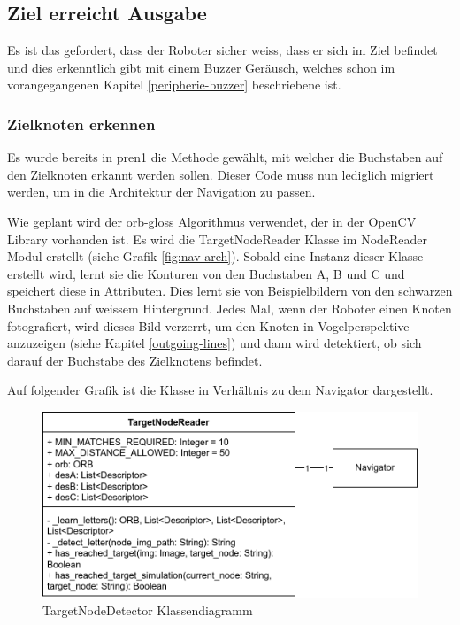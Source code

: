 \subsection{Ziel erreicht Ausgabe}

Es ist das gefordert, dass der Roboter sicher weiss, dass er sich im Ziel befindet und dies erkenntlich gibt mit einem Buzzer Geräusch, welches schon im vorangegangenen Kapitel \ref{peripherie-buzzer} beschriebene ist.

\subsubsection{Zielknoten erkennen}
\label{detect-target}

Es wurde bereits in \acrshort{pren1} die Methode gewählt, mit welcher die Buchstaben auf den Zielknoten erkannt werden sollen. Dieser Code muss nun lediglich migriert werden, um in die Architektur der Navigation zu passen.

Wie geplant wird der \gls{orb-gloss} Algorithmus verwendet, der in der OpenCV Library vorhanden ist. Es wird die TargetNodeReader Klasse im NodeReader Modul erstellt (siehe Grafik \ref{fig:nav-arch}). Sobald eine Instanz dieser Klasse erstellt wird, lernt sie die Konturen von den Buchstaben A, B und C und speichert diese in Attributen.
Dies lernt sie von Beispielbildern von den schwarzen Buchstaben auf weissem Hintergrund.
Jedes Mal, wenn der Roboter einen Knoten fotografiert, wird dieses Bild verzerrt, um den Knoten in Vogelperspektive anzuzeigen (siehe Kapitel \ref{outgoing-lines}) und dann wird detektiert, ob sich darauf der Buchstabe des Zielknotens befindet.

Auf folgender Grafik ist die Klasse in Verhältnis zu dem Navigator dargestellt.

\begin{figure}[H]
\centering
\includegraphics[width=\textwidth]{assets/IT/robot-sw-architecture-target-node-detector.png}
\caption{TargetNodeDetector Klassendiagramm}
\label{fig:target-node-nav}
\end{figure}

